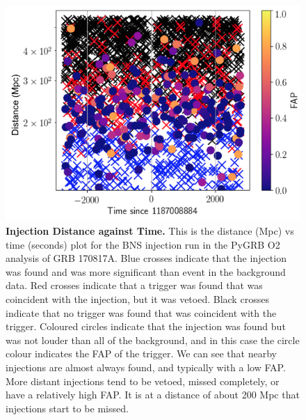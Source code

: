 \documentclass[11pt]{cuthesis}
\begin{document}
\begin{figure} %
\begin{center}
\includegraphics[width=0.8\linewidth]{found_missed_injections_dist_time.png}
\end{center}
\caption{\textbf{Injection Distance against Time.} This is the distance (Mpc) vs time (seconds) plot for the BNS injection run in the PyGRB O2 analysis of GRB 170817A. Blue crosses indicate that the injection was found and was more significant than event in the background data. Red crosses indicate that a trigger was found that was coincident with the injection, but it was vetoed. Black crosses indicate that no trigger was found that was coincident with the trigger. Coloured circles indicate that the injection was found but was not louder than all of the background, and in this case the circle colour indicates the FAP of the trigger. We can see that nearby injections are almost always found, and typically with a low FAP. More distant injections tend to be vetoed, missed completely, or have a relatively high FAP. It is at a distance of about 200 Mpc that injections start to be missed.} 
\label{fig:old inj dist time}
\end{figure}
\end{document}
